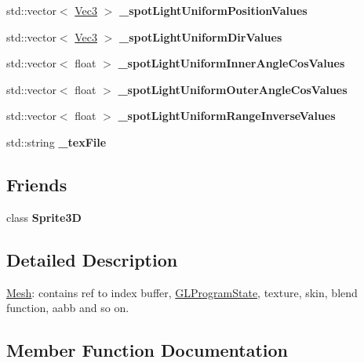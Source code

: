 \begin{DoxyCompactItemize}
\item 
\mbox{\label{classMesh_a7b38a3f2f2f6f933a51b396f5eb5483b}} 
std\+::vector$<$ \hyperlink{classVec3}{Vec3} $>$ {\bfseries \+\_\+spot\+Light\+Uniform\+Position\+Values}
\item 
\mbox{\label{classMesh_a243656307d9d19129f48870247c121e3}} 
std\+::vector$<$ \hyperlink{classVec3}{Vec3} $>$ {\bfseries \+\_\+spot\+Light\+Uniform\+Dir\+Values}
\item 
\mbox{\label{classMesh_acf311b8a33cc1c3a9c0754ae9692c914}} 
std\+::vector$<$ float $>$ {\bfseries \+\_\+spot\+Light\+Uniform\+Inner\+Angle\+Cos\+Values}
\item 
\mbox{\label{classMesh_a4e54ff3156ef7f147075a870f693f07e}} 
std\+::vector$<$ float $>$ {\bfseries \+\_\+spot\+Light\+Uniform\+Outer\+Angle\+Cos\+Values}
\item 
\mbox{\label{classMesh_a2209e4ce75bdb15d65e3e1870a800677}} 
std\+::vector$<$ float $>$ {\bfseries \+\_\+spot\+Light\+Uniform\+Range\+Inverse\+Values}
\item 
\mbox{\label{classMesh_a029bbc1384bb0e9fb1d6f1e70b92ca25}} 
std\+::string {\bfseries \+\_\+tex\+File}
\end{DoxyCompactItemize}
\subsection*{Friends}
\begin{DoxyCompactItemize}
\item 
\mbox{\label{classMesh_af6c4966aafabcc15b700aea1c2e12528}} 
class {\bfseries Sprite3D}
\end{DoxyCompactItemize}


\subsection{Detailed Description}
\hyperlink{classMesh}{Mesh}\+: contains ref to index buffer, \hyperlink{classGLProgramState}{G\+L\+Program\+State}, texture, skin, blend function, aabb and so on. 

\subsection{Member Function Documentation}
\mbox{\label{classMesh_aceba31e4566e9369d03a169c3742eb0f}} 

